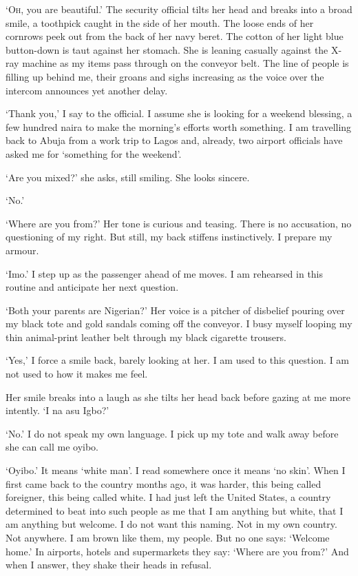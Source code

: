 \documentclass[../main.tex]{subfiles}
\begin{document}
\begin{multicols}{2}
\lettrine{‘O}{h,} you are beautiful.’ The security official tilts her head and breaks into a broad smile, a toothpick caught in the side of her mouth. The loose ends of her cornrows peek out from the back of her navy beret. The cotton of her light blue button-down is taut against her stomach. She is leaning casually against the X-ray machine as my items pass through on the conveyor belt. The line of people is filling up behind me, their groans and sighs increasing as the voice over the intercom announces yet another delay. 

‘Thank you,’ I say to the official. I assume she is looking for a weekend blessing, a few hundred naira to make the morning’s efforts worth something. I am travelling back to Abuja from a work trip to Lagos and, already, two airport officials have asked me for ‘something for the weekend’. 

‘Are you mixed?’ she asks, still smiling. She looks sincere. 

‘No.’ 

‘Where are you from?’ Her tone is curious and teasing. There is no accusation, no questioning of my right. But still, my back stiffens instinctively. I prepare my armour. 

‘Imo.’ I step up as the passenger ahead of me moves. I am rehearsed in this routine and anticipate her next question. 

‘Both your parents are Nigerian?’ Her voice is a pitcher of disbelief pouring over my black tote and gold sandals coming off the conveyor. I busy myself looping my thin animal-print leather belt through my black cigarette trousers. 

‘Yes,’ I force a smile back, barely looking at her. I am used to this question. I am not used to how it makes me feel. 

Her smile breaks into a laugh as she tilts her head back before gazing at me more intently. ‘I na asu Igbo?’ 

‘No.’ I do not speak my own language. I pick up my tote and walk away before she can call me oyibo. 

‘Oyibo.’ It means ‘white man’. I read somewhere once it means ‘no skin’. When I first came back to the country months ago, it was harder, this being called foreigner, this being called white. I had just left the United States, a country determined to beat into such people as me that I am anything but white, that I am anything but welcome. I do not want this naming. Not in my own country. Not anywhere. I am brown like them, my people. But no one says: ‘Welcome home.’ In airports, hotels and supermarkets they say: ‘Where are you from?’ And when I answer, they shake their heads in refusal. 


\end{multicols}
\end{document}
